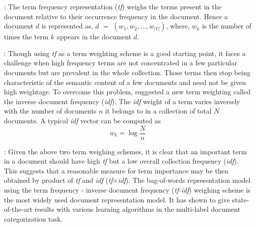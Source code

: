  : The term frequency representation (\emph{tf}) weighs the terms present in the document relative to their occurrence frequency in the document. Hence a document $d$ is represented as, $d$ $=$ $(w_{1}, w_{2}, \ldots, w_{|V|})$, where, $w_{k}$ is the number of times the term $k$ appears in the document $d$. 

 : Though using \emph{tf} as a term weighting scheme is a good starting point, it faces a challenge when high frequency terms are not concentrated in a few particular documents but are prevalent in the whole collection. Those terms then stop being characteristic of the semantic content of a few documents and need not be given high weightage. To overcome this problem, \cite{salton1988term} suggested a new term weighting called the inverse document frequency (\emph{idf}). The \emph{idf} weight of a term varies inversely with the number of documents $n$ it belongs to in a collection of total $N$ documents. A typical \emph{idf} vector can be computed as 
\begin{equation}
w_{k} = \log \frac{N}{n}
\end{equation}

 : Given the above two term weighing schemes, it is clear that an important term in a document should have high \emph{tf} but a low overall collection frequency (\emph{idf}). This suggests that a reasonable measure for term importance may be then obtained by product of \emph{tf} and \emph{idf} (\emph{tf}$\times$\emph{idf}). The bag-of-words representation model using the term frequency - inverse document frequency (\emph{tf-idf}) weighing scheme is the most widely used document representation model. It has shown to give state-of-the-art results with various learning algorithms in the multi-label document categorization task.


